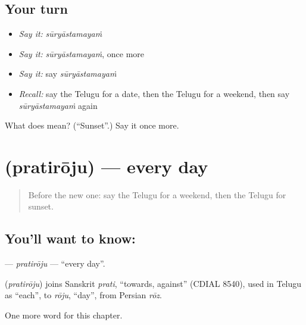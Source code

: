 \subsection*{Your turn}
\begin{itemize}
\raggedright
  \item \emph{Say it:} \emph{sūryāstamayaṁ}
  \item \emph{Say it:} \emph{sūryāstamayaṁ}, once more
  \item \emph{Say it:} say \emph{sūryāstamayaṁ}
  \item \emph{Recall:} say the Telugu for a date, then the Telugu for a weekend, then say \emph{sūryāstamayaṁ} again
\end{itemize}

\begin{tcolorbox}[breakable,colback=teal!4,colframe=teal!35!black,title={Before you move on}]
What does  mean? (\textquotedblleft{}Sunset\textquotedblright{}.) Say it once more.
\end{tcolorbox}
\section[\texorpdfstring{\te{ప్రతిరోజు} (pratirōju)}{ప్రతిరోజు (pratirōju)}]{ (pratirōju) — every day}

\label{lesson:TE-C171-pratiroju}



\begin{quote}
Before the new one: say the Telugu for a weekend, then the Telugu for sunset.
\end{quote}

\subsection*{You'll want to know: }
\textbf{} — \emph{pratirōju} — \textquotedblleft{}every day\textquotedblright{}.

\begin{cousinweb}
\textbf{} (\emph{pratirōju}) joins Sanskrit \emph{prati}, \textquotedblleft{}towards, against\textquotedblright{} (CDIAL 8540), used in Telugu as \textquotedblleft{}each\textquotedblright{}, to \emph{rōju}, \textquotedblleft{}day\textquotedblright{}, from Persian \emph{rōz}.
\end{cousinweb}

\begin{grammarlens}[title={What you've built}]
One more word for this chapter.
\end{grammarlens}

